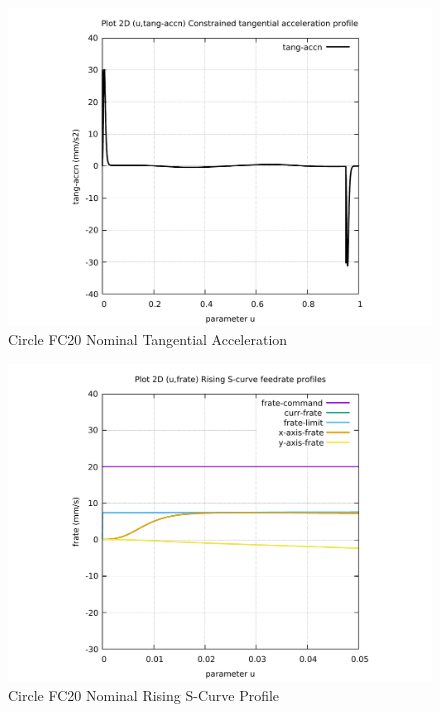 \begin{figure}
	\caption     {Circle FC20 Nominal Tangential Acceleration}
	\label{14-img-Circle-FC20-Nominal-Tangential-Acceleration.pdf}
	\includegraphics[width=1.00\textwidth]{Chap4/appendix/app-Circle/plots/14-img-Circle-FC20-Nominal-Tangential-Acceleration.pdf}
\end{figure}

\clearpage
\pagebreak

\begin{figure}
	\caption     {Circle FC20 Nominal Rising S-Curve Profile}
	\label{15-img-Circle-FC20-Nominal-Rising-S-Curve-Profile.pdf}
	\includegraphics[width=1.00\textwidth]{Chap4/appendix/app-Circle/plots/15-img-Circle-FC20-Nominal-Rising-S-Curve-Profile.pdf}
\end{figure}


